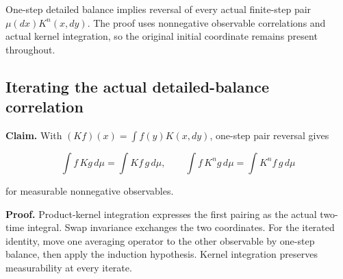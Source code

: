 \documentclass[11pt,a4paper]{report}
\begin{document}
One-step detailed balance implies reversal of every actual finite-step pair \(\mu(dx)K^n(x,dy)\). The proof uses nonnegative observable correlations and actual kernel integration, so the original initial coordinate remains present throughout.

\subsection{\texorpdfstring{Iterating the actual detailed-balance correlation}{Iterating the actual detailed-balance correlation}}
\label{report-step-WassersteinMixing-SemigroupPowers-lean-1}


\textbf{Claim.} With \((Kf)(x)=\int f(y)K(x,dy)\), one-step pair reversal gives

\[\int f\,Kg\,d\mu=\int Kf\,g\,d\mu,\qquad\int f\,K^ng\,d\mu=\int K^nf\,g\,d\mu\]

for measurable nonnegative observables.



\textbf{Proof.} Product-kernel integration expresses the first pairing as the actual two-time integral. Swap invariance exchanges the two coordinates. For the iterated identity, move one averaging operator to the other observable by one-step balance, then apply the induction hypothesis. Kernel integration preserves measurability at every iterate.
\end{document}
